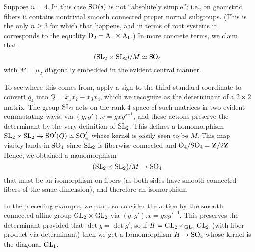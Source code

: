 \documentclass[10pt]{article}
\renewcommand{\(}{\left(}
\renewcommand{\)}{\right)}
\numberwithin{thm}{subsection}
\begin{document}
\begin{ex}\label{so4}
Suppose $n = 4$.  In this case ${\rm{SO}}(q)$ is not ``absolutely simple''; i.e., 
on geometric fibers it 
contains nontrivial smooth connected proper normal subgroups.
(This is the only $n \ge 3$ for which 
that happens, and in terms of root systems it corresponds
to the equality ${\rm{D}}_2 = {\rm{A}}_1 \times {\rm{A}}_1$.)  In more concrete terms, we claim that
$$({\rm{SL}}_2 \times {\rm{SL}}_2)/M \simeq {\rm{SO}}_4$$
with $M = \mu_2$ diagonally embedded in the evident central manner.  

To see where this comes from, apply a
sign to the third standard coordinate to convert $q_4$ into 
$Q = x_1 x_2 - x_3 x_4$, which we recognize as the determinant of a $2 \times 2$ matrix.
The group ${\rm{SL}}_2$ acts on the rank-4 space of
such matrices in two evident commutating ways, via $(g,g').x = gx{g'}^{-1}$, 
and these actions preserve the determinant by the very definition of ${\rm{SL}}_2$.
This defines a homomorphism
${\rm{SL}}_2 \times {\rm{SL}}_2 \rightarrow {\rm{SO}}'(Q) \simeq {\rm{SO}}'_4$
whose kernel is easily seen to be $M$. 
This map visibly lands in
${\rm{SO}}_4$ since ${\rm{SL}}_2$ is fiberwise connected
and ${\rm{O}}_4/{\rm{SO}}_4 = {\mathbf{Z}}/2{\mathbf{Z}}$.  Hence, we obtained a monomorphism
$$({\rm{SL}}_2 \times {\rm{SL}}_2)/M \rightarrow {\rm{SO}}_4$$
that must be an isomorphism on fibers (as both sides have smooth
connected fibers of the same dimension), and therefore an isomorphism.
\end{ex}

\begin{rem}\label{remso4}
 In the preceding example, we can also consider the action by
the smooth connected affine group ${\rm{GL}}_2 \times {\rm{GL}}_2$
via $(g,g').x = gx{g'}^{-1}$.  This preserves the determinant provided
that $\det g = \det g'$, so if $H = {\rm{GL}}_2 \times_{{\rm{GL}}_1} {\rm{GL}}_2$
(with fiber product via determinant) then we get a homomorphism $H \rightarrow
{\rm{SO}}_4$ whose kernel is the diagonal ${\rm{GL}}_1$.
\end{rem}
\end{document}

